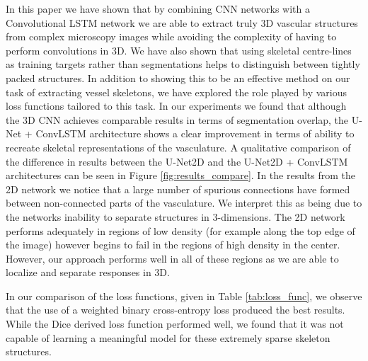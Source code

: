 \documentclass[journal,transmag]{IEEEtran}
\begin{document}
In this paper we have shown that by combining CNN networks with a Convolutional LSTM network we are able to extract truly 3D vascular structures from complex microscopy images while avoiding the complexity of having to perform convolutions in 3D. We have also shown that using skeletal centre-lines as training targets rather than segmentations helps to distinguish between tightly packed structures. In addition to showing this to be an effective method on our task of extracting vessel skeletons, we have explored the role played by various loss functions tailored to this task. In our experiments we found that although the 3D CNN achieves comparable results in terms of segmentation overlap, the U-Net + ConvLSTM architecture shows a clear improvement in terms of ability to recreate skeletal representations of the vasculature. A qualitative comparison of the difference in results between the U-Net2D and the U-Net2D + ConvLSTM architectures can be seen in Figure \ref{fig:results_compare}. In the results from the 2D network we notice that a large number of spurious connections have formed between non-connected parts of the vasculature. We interpret this as being due to the networks inability to separate structures in 3-dimensions. The 2D network performs adequately in regions of low density (for example along the top edge of the image) however begins to fail in the regions of high density in the center. However, our approach performs well in all of these regions as we are able to localize and separate responses in 3D.

In our comparison of the loss functions, given in Table \ref{tab:loss_func}, we observe that the use of a weighted binary cross-entropy loss produced the best results. While the Dice derived loss function performed well, we found that it was not capable of learning a meaningful model for these extremely sparse skeleton structures.
\end{document}
